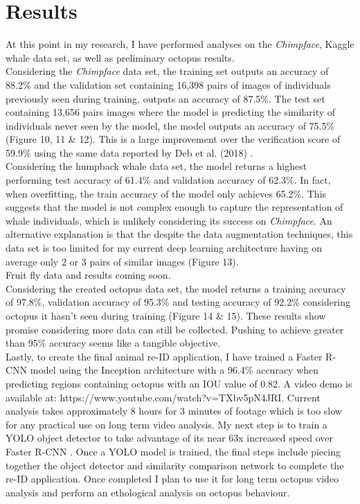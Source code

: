 \documentclass[11pt]{article}
\begin{document}
\section*{Results}

At this point in my research, I have performed analyses on the \textit{Chimpface}, Kaggle whale data set, as well as preliminary octopus results.
\newline
\\
Considering the \textit{Chimpface} data set, the training set outputs an accuracy of 88.2\% and the validation set containing 16,398 pairs of images of individuals previously seen during training, outputs an accuracy of 87.5\%. The test set containing 13,656 pairs images where the model is predicting the similarity of individuals never seen by the model, the model outputs an accuracy of 75.5\% (Figure 10, 11 \& 12). This is a large improvement over the verification score of 59.9\% using the same data reported by Deb et al. (2018) \cite{deb2018face}.
\newline
\\
Considering the humpback whale data set, the model returns a highest performing test accuracy of 61.4\% and validation accuracy of 62.3\%. In fact, when overfitting, the train accuracy of the model only achieves 65.2\%. This suggests that the model is not complex enough to capture the representation of whale individuals, which is unlikely considering its success on \textit{Chimpface}. An alternative explanation is that the despite the data augmentation techniques, this data set is too limited for my current deep learning architecture having on average only 2 or 3 pairs of similar images (Figure 13).
\newline
\\
Fruit fly data and results coming soon.
\newline
\\
Considering the created octopus data set, the model returns a training accuracy of 97.8\%, validation accuracy of 95.3\% and testing accuracy of 92.2\% considering octopus it hasn't seen during training (Figure 14 \& 15). These results show promise considering more data can still be collected. Pushing to achieve greater than 95\% accuracy seems like a tangible objective. 
\newline
\\
Lastly, to create the final animal re-ID application, I have trained a Faster R-CNN model using the Inception architecture with a 96.4\% accuracy when predicting regions containing octopus with an IOU value of 0.82. A video demo is available at: https://www.youtube.com/watch?v=TXbv5pN4JRI. Current analysis takes approximately 8 hours for 3 minutes of footage which is too slow for any practical use on long term video analysis. My next step is to train a YOLO object detector to take advantage of its near 63x increased speed over Faster R-CNN \cite{redmon2016you}. Once a YOLO model is trained, the final steps include piecing together the object detector and similarity comparison network to complete the re-ID application. Once completed I plan to use it for long term octopus video analysis and perform an ethological analysis on octopus behaviour.
\newline
\\
\end{document}
